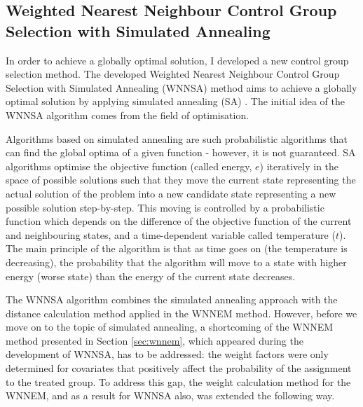 		\subsection{Weighted Nearest Neighbour Control Group Selection with Simulated Annealing}
		\label{sec:wnnsa}
						     
										
		In order to achieve a globally optimal solution, I developed a new control group selection method. The developed Weighted Nearest Neighbour Control Group Selection with Simulated Annealing (WNNSA) method \cite{szeker2021optimized} aims to achieve a globally optimal solution by applying simulated annealing (SA) \cite{van1987simulated}. The initial idea of the WNNSA algorithm comes from the field of optimisation.
										
		Algorithms based on simulated annealing are such probabilistic algorithms that can find the global optima of a given function - however, it is not guaranteed. SA algorithms optimise the objective function (called energy, $e$) iteratively in the space of possible solutions such that they move the current state representing the actual solution of the problem into a new candidate state representing a new possible solution step-by-step. This moving is controlled by a probabilistic function which depends on the difference of the objective function of the current and neighbouring states, and a time-dependent variable called temperature ($t$). The main principle of the algorithm is that as time goes on (the temperature is decreasing), the probability that the algorithm will move to a state with higher energy (worse state) than the energy of the current state decreases.
										
		The WNNSA algorithm combines the simulated annealing approach with the distance calculation method applied in the WNNEM method. However, before we move on to the topic of simulated annealing, a shortcoming of the WNNEM method presented in Section \ref{sec:wnnem}, which appeared during the development of WNNSA, has to be addressed: the weight factors were only determined for covariates that positively affect the probability of the assignment to the treated group. To address this gap, the weight calculation method for the WNNEM, and as a result for WNNSA also, was extended the following way.
				  
